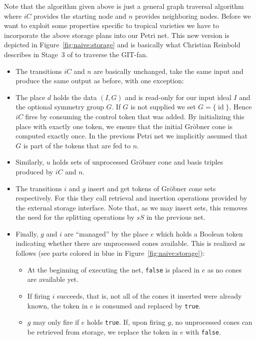 \documentclass[
  paper=a4,
  titlepage,
  bibliography=totoc,
  pagesize=pdftex
]{scrartcl}
\numberwithin{figure}{section}
\numberwithin{equation}{section}
\numberwithin{table}{section}
\DeclareMathOperator{\id}{id}
\theoremstyle{definition}
\numberwithin{definition}{section}
\begin{document}
Note that the algorithm given above is just a general graph traversal algorithm where $iC$
provides the starting node and $n$ provides neighboring nodes. Before we want to exploit
some properties specific to tropical varieties we have to incorporate the above storage
plans into our Petri net. This new version is depicted in Figure~\ref{fig:naive:storage}
and is basically what Christian Reinbold describes in Stage~3 of
\cite[Section~4.4]{reinboldGitFan} to traverse the GIT-fan.
\begin{itemize}
  \item The transitions $iC$ and $n$ are basically unchanged, take the same input and
    produce the same output as before, with one exception:
  \item The place $d$ holds the data $(I, G)$ and is read-only for our input ideal $I$ and
    the optional symmetry group $G$. If $G$ is not supplied we set $G=\{\id\}$. Hence $iC$
    fires by consuming the control token that was added. By initializing this place with
    exactly one token, we ensure that the initial Gröbner cone is computed exactly once.
    In the previous Petri net we implicitly assumed that $G$ is part of the tokens that
    are fed to $n$.
  \item Similarly, $u$ holds sets of unprocessed Gröbner cone and basis triples produced
    by $iC$ and $n$.
  \item The transitions $i$ and $g$ insert and get tokens of Gröbner cone sets
    respectively. For this they call retrieval and insertion operations provided by the
    external storage interface. Note that, as we may insert sets, this removes the need
    for the splitting operations by $sS$ in the previous net.
  \item Finally, $g$ and $i$ are \enquote{managed} by the place $e$ which holds a Boolean
    token indicating whether there are unprocessed cones available. This is realized as
    follows (see parts colored in blue in Figure~\ref{fig:naive:storage}):
    \begin{itemize}
      \item At the beginning of executing the net, \texttt{false} is placed in $e$ as no
        cones are available yet.
      \item If firing $i$ succeeds, that is, not all of the cones it inserted were already
        known, the token in $e$ is consumed and replaced by \texttt{true}.
      \item $g$ may only fire if $e$ holds \texttt{true}. If, upon firing $g$, no
        unprocessed cones can be retrieved from storage, we replace the token in $e$ with
        \texttt{false}.
    \end{itemize}
\end{itemize}
\end{document}
